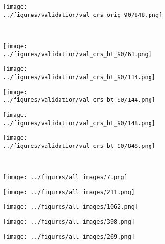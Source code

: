 \begin{figure}[h!]
\begin{subfigure}{0.19\textwidth}
		\centering
		\texttt{[image: ../figures/validation/val\_crs\_orig\_90/848.png]}
		\label{fig:1}
	\end{subfigure}
	\vspace{-0.35cm}
	\\
		\begin{subfigure}{0.19\textwidth}
		\centering
		\texttt{[image: ../figures/validation/val\_crs\_bt\_90/61.png]}
		\label{fig:1}
	\end{subfigure}
	\begin{subfigure}{0.19\textwidth}
		\centering
		\texttt{[image: ../figures/validation/val\_crs\_bt\_90/114.png]}
		\label{fig:1}
	\end{subfigure}
	\begin{subfigure}{0.19\textwidth}
		\centering
		\texttt{[image: ../figures/validation/val\_crs\_bt\_90/144.png]}
		\label{fig:1}
	\end{subfigure}
	\begin{subfigure}{0.19\textwidth}
		\centering
		\texttt{[image: ../figures/validation/val\_crs\_bt\_90/148.png]}
		\label{fig:1}
	\end{subfigure}
	\begin{subfigure}{0.19\textwidth}
		\centering
		\texttt{[image: ../figures/validation/val\_crs\_bt\_90/848.png]}
		\label{fig:1}
	\end{subfigure}
	\vspace{-0.35cm}
	\\
	\begin{subfigure}{0.19\textwidth}
		\centering
		\texttt{[image: ../figures/all\_images/7.png]}
		\label{fig:1}
	\end{subfigure}
	\begin{subfigure}{0.19\textwidth}
		\centering
		\texttt{[image: ../figures/all\_images/211.png]}
		\label{fig:1}
	\end{subfigure}
	\begin{subfigure}{0.19\textwidth}
		\centering
		\texttt{[image: ../figures/all\_images/1062.png]}
		\label{fig:1}
	\end{subfigure}
	\begin{subfigure}{0.19\textwidth}
		\centering
		\texttt{[image: ../figures/all\_images/398.png]}
		\label{fig:1}
	\end{subfigure}
	\begin{subfigure}{0.19\textwidth}
		\centering
		\texttt{[image: ../figures/all\_images/269.png]}

\end{subfigure}
\end{figure}
